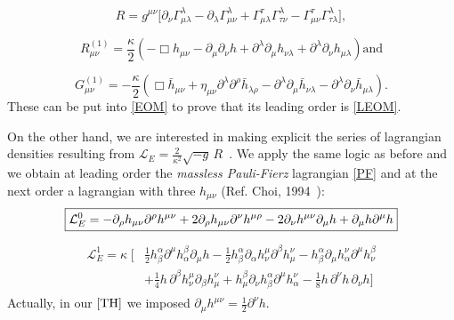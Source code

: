 \documentclass[12pt,a4paper,oneside]{article}
\numberwithin{equation}{section}   %
\begin{document}
\begin{equation}
R = g^{\mu\nu}\bigl[\partial_\nu \Gamma^\lambda_{\mu\lambda} - \partial_\lambda\Gamma^\lambda_{\mu\nu} + \Gamma^\tau_{\mu\lambda}\Gamma^\lambda_{\tau\nu} - \Gamma^\tau_{\mu\nu}\Gamma^\lambda_{\tau\lambda}\bigr],
\end{equation}

\begin{equation}
R_{\mu\nu}^{(1)} = \frac{\kappa}{2}\left( -\Box h_{\mu\nu} - \partial_\mu \partial_\nu h + \partial^\lambda \partial_\mu h_{\nu\lambda} + \partial^\lambda \partial_\nu h_{\mu\lambda} \right) \text{and}
\end{equation}

\begin{equation}
G_{\mu\nu}^{(1)} = -\frac{\kappa}{2}\left( \Box \bar{h}_{\mu\nu} + \eta_{\mu\nu} \partial^\lambda \partial^\rho \bar{h}_{\lambda\rho} - \partial^\lambda \partial_\mu \bar{h}_{\nu\lambda} - \partial^\lambda \partial_\nu \bar{h}_{\mu\lambda} \right).
\end{equation}
These can be put into \eqref{EOM} to prove that its leading order is \eqref{LEOM}.

On the other hand, we are interested in making explicit the series of
lagrangian densities resulting from
$\mathcal{L}_E=\frac{2}{\kappa^2}\sqrt{-g}\,R$~\cite{Feynman1963}. 
We apply the same logic as before and we obtain at
leading order the \textit{massless Pauli-Fierz} lagrangian \eqref{PF} and at the
 next order a lagrangian with three $h_{\mu\nu}$ (Ref. Choi, 1994~\cite{ChoiShimSong1995}):
\begin{equation}\boxed{\label{PF}
\mathcal{L}^0_E =
-\partial_\rho h_{\mu\nu}\partial^\rho h^{\mu\nu}
+2\partial_\rho h_{\mu\nu}\partial^\nu h^{\mu\rho}
-2\partial_\nu h^{\mu\nu}\partial_\mu h
+\partial_\mu h\partial^\mu h}
\end{equation}
\begin{align}
\boxed{
\begin{aligned}\label{TH}
\mathcal{L}_E^{1}={} \kappa \;\Big[ &
\frac{1}{2} h_\beta^\alpha \partial^\mu h_\alpha^\beta \partial_\mu h
- \frac{1}{2} h_\beta^\alpha \partial_\alpha h_\nu^\mu \partial^\beta h_\mu^\nu
- h_\beta^\alpha \partial_\mu h_\alpha^\nu \partial^\mu h_\nu^\beta\\
&+ \frac{1}{4} h\, \partial^\beta h_\nu^\mu \partial_\beta h_\mu^\nu
+ h_\mu^\beta \partial_\nu h_\beta^\alpha \partial^\mu h_\alpha^\nu
- \frac{1}{8} h\, \partial^\nu h\, \partial_\nu h  \Big]
\end{aligned}
}
\end{align}
Actually, in our $\eqref{TH}$ we imposed
$\partial_\mu h^{\mu\nu} = \frac{1}{2} \partial^\nu h$.
\end{document}
